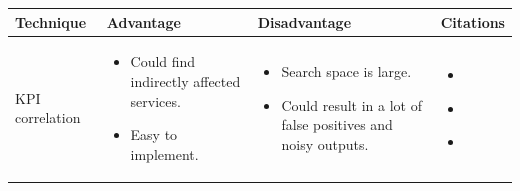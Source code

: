 \begin{longtable}{| p{23mm} | p{42mm} | p{42mm} | p{42mm} |}
\hline
    \textbf{Technique} &
    \textbf{Advantage} &
    \textbf{Disadvantage} &
    \textbf{Citations} \\ \hline
    
    KPI correlation &
    \vspace{-8mm}
    \begin{itemize}[leftmargin=0mm,noitemsep,nolistsep,label={}] 
        \item Could find indirectly affected services.
        \item Easy to implement.
        \vspace{-7mm}
    \end{itemize} &
    \vspace{-8mm}
    \begin{itemize}[leftmargin=0mm,noitemsep,nolistsep,label={}] 
            \item Search space is large.
            \item Could result in a lot of false positives and noisy outputs. 
            \vspace{-7mm}
    \end{itemize} &
    \vspace{-8mm}
    \begin{itemize}[leftmargin=0mm,noitemsep,nolistsep,label={}] 
        \item \cite{nguyen2011pal}
        \item \cite{nguyen2013fchain}
        \item \cite{wang2020root}
        \vspace{-7mm}
    \end{itemize} \\ \hline
    

\end{longtable}
